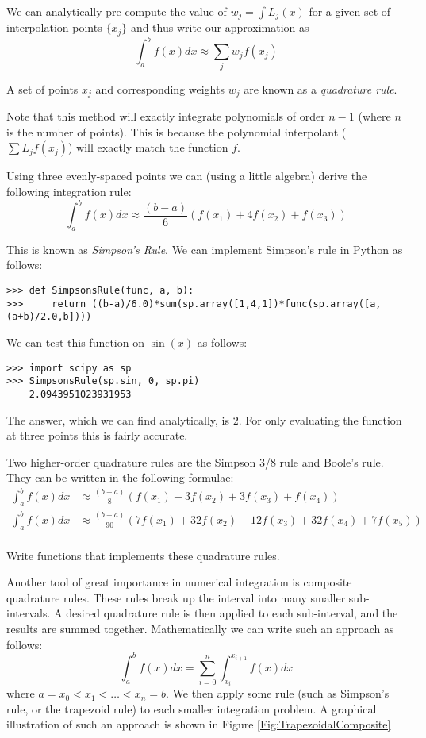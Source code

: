 We can analytically pre-compute the value of $w_j = \int L_j(x)$ for a given set of interpolation points $\{x_j\}$ and thus write our approximation as
\[
\int_a^b f(x) dx \approx \sum_j w_j f(x_j)
\]

A set of points $x_j$ and corresponding weights $w_j$ are known as a \emph{quadrature rule}.

Note that this method will exactly integrate polynomials of order $n-1$ (where $n$ is the number of points).
This is because the polynomial interpolant ($\sum L_j f(x_j)$) will exactly match the function $f$.

Using three evenly-spaced points we can (using a little algebra) derive the following integration rule:
\[
\int_a^b f(x) dx \approx \frac{(b-a)}{6}\left(f(x_1) + 4 f(x_2) + f(x_3)\right)
\]

This is known as \emph{Simpson's Rule}.
We can implement Simpson's rule in Python as follows:
\begin{lstlisting}
>>> def SimpsonsRule(func, a, b):
>>>     return ((b-a)/6.0)*sum(sp.array([1,4,1])*func(sp.array([a,(a+b)/2.0,b])))
\end{lstlisting}

We can test this function on $\sin(x)$ as follows:
\begin{lstlisting}
>>> import scipy as sp
>>> SimpsonsRule(sp.sin, 0, sp.pi)
	2.0943951023931953
\end{lstlisting}

The answer, which we can find analytically, is $2$.
For only evaluating the function at three points this is fairly accurate.

\begin{problem}
Two higher-order quadrature rules are the Simpson 3/8 rule and Boole's rule.
They can be written in the following formulae:
\begin{align*}
\int_a^b f(x) dx &\approx \frac{(b-a)}{8}\left(f(x_1) + 3 f(x_2) + 3 f(x_3) + f(x_4)\right) \\
\int_a^b f(x) dx &\approx \frac{(b-a)}{90}\left(7f(x_1) + 32 f(x_2) + 12 f(x_3) + 32f(x_4) + 7 f(x_5)\right) \\
\end{align*}

Write functions that implements these quadrature rules.
\end{problem}

Another tool of great importance in numerical integration is composite quadrature rules.
These rules break up the interval into many smaller sub-intervals.
A desired quadrature rule is then applied to each sub-interval, and the results are summed together.
Mathematically we can write such an approach as follows:
\[
\int_a^b f(x) dx = \sum_{i=0}^n \int_{x_i}^{x_{i+1}} f(x) dx
\]
where $a = x_0 < x_1 < \ldots < x_n = b$.
We then apply some rule (such as Simpson's rule, or the trapezoid rule) to each smaller integration problem.
A graphical illustration of such an approach is shown in Figure \ref{Fig:TrapezoidalComposite}

